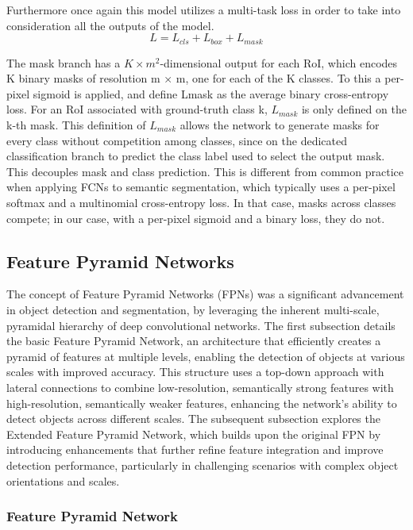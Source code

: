 Furthermore once again this model utilizes a multi-task loss in order to take into consideration all the outputs of the model.
\begin{equation}
    L = L_{cls} + L_{box} + L_{mask} \tag{4}
\end{equation}
 
The mask branch has a $K \times m^2$-dimensional output for each RoI, which encodes K binary masks of resolution m × m, one for each of the K classes.
To this a per-pixel sigmoid is applied, and define Lmask as the average binary cross-entropy loss. For an RoI associated with ground-truth class k, 
$L_{mask}$ is only defined on the k-th mask. This definition of $L_{mask}$ allows the network to generate masks for every class without competition 
among classes, since on the dedicated classification branch to predict the class label used to select the output mask. This decouples mask and 
class prediction. This is different from common practice when applying FCNs to semantic segmentation, which typically uses a per-pixel softmax and a 
multinomial cross-entropy loss. In that case, masks across classes compete; in our case, with a per-pixel sigmoid and a binary
loss, they do not.


\subsection{Feature Pyramid Networks}

The concept of Feature Pyramid Networks (FPNs) was a significant advancement in object detection and segmentation, by leveraging the inherent multi-scale, 
pyramidal hierarchy of deep convolutional networks. The first subsection details the basic Feature Pyramid Network, an architecture that efficiently creates 
a pyramid of features at multiple levels, enabling the detection of objects at various scales with improved accuracy. This structure uses a top-down approach 
with lateral connections to combine low-resolution, semantically strong features with high-resolution, semantically weaker features, enhancing the network’s 
ability to detect objects across different scales. The subsequent subsection explores the Extended Feature Pyramid Network, which builds upon the original FPN 
by introducing enhancements that further refine feature integration and improve detection performance, particularly in challenging scenarios with complex object 
orientations and scales.


\subsubsection{Feature Pyramid Network}

